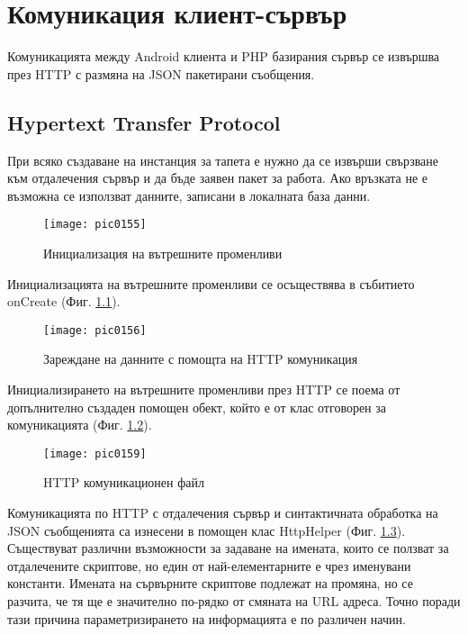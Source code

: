 \newpage
\chapter{Комуникация клиент-сървър}
\label{chapter06}

Комуникацията между Android клиента и PHP базирания сървър се извършва през HTTP с размяна на JSON пакетирани съобщения. 

\section{Hypertext Transfer Protocol}

При всяко създаване на инстанция за тапета е нужно да се извърши свързване към отдалечения сървър и да бъде заявен пакет за работа. Ако връзката не е възможна се използват данните, записани в локалната база данни. 

\begin{figure}[h]
  \centering
  \texttt{[image: pic0155]}
  \caption{Инициализация на вътрешните променливи}
\label{fig:pic0155}
\end{figure}
\FloatBarrier

Инициализацията на вътрешните променливи се осъществява в събитието onCreate (Фиг. \ref{fig:pic0155}).

\begin{figure}[h]
  \centering
  \texttt{[image: pic0156]}
  \caption{Зареждане на данните с помощта на HTTP комуникация}
\label{fig:pic0156}
\end{figure}
\FloatBarrier

Инициализирането на вътрешните променливи през HTTP се поема от допълнително създаден помощен обект, който е от клас отговорен за комуникацията (Фиг. \ref{fig:pic0156}). 

\begin{figure}[h]
  \centering
  \texttt{[image: pic0159]}
  \caption{HTTP комуникационен файл}
\label{fig:pic0159}
\end{figure}
\FloatBarrier

Комуникацията  по HTTP с отдалечения сървър и синтактичната обработка на JSON съобщенията са изнесени в помощен клас HttpHelper (Фиг. \ref{fig:pic0159}). Съществуват различни възможности за задаване на имената, които се ползват за отдалечените скриптове, но един от най-елементарните е чрез именувани константи. Имената на сървърните скриптове подлежат на промяна, но се разчита, че тя ще е значително по-рядко от смяната на URL адреса. Точно поради тази причина параметризирането на информацията е по различен начин. 


